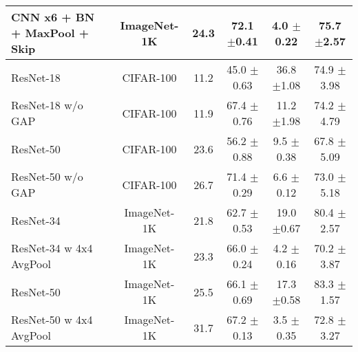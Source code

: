 \begin{table}[h]
{\begin{tabular}{@{}lccccc@{}}
CNN x6 + BN + MaxPool + Skip & ImageNet-1K & 24.3 & 72.1 $\pm$0.41 & 4.0 $\pm$0.22 & 75.7 $\pm$2.57 \\ \midrule \midrule
ResNet-18 & CIFAR-100 & 11.2 & 45.0 $\pm$0.63 & 36.8 $\pm$1.08 & 74.9 $\pm$3.98 \\
ResNet-18 w/o GAP & CIFAR-100 & 11.9 & 67.4 $\pm$0.76 & 11.2 $\pm$1.98 & 74.2 $\pm$4.79 \\
ResNet-50 & CIFAR-100 & 23.6 & 56.2 $\pm$0.88 & 9.5 $\pm$0.38 & 67.8 $\pm$5.09 \\
ResNet-50 w/o GAP& CIFAR-100 & 26.7 & 71.4 $\pm$0.29 & 6.6 $\pm$0.12 & 73.0 $\pm$5.18 \\ \midrule
ResNet-34 & ImageNet-1K & 21.8 & 62.7 $\pm$0.53 & 19.0 $\pm$0.67 & 80.4 $\pm$2.57 \\
ResNet-34 w 4x4 AvgPool & ImageNet-1K & 23.3 & 66.0 $\pm$0.24 & 4.2 $\pm$0.16 & 70.2 $\pm$3.87 \\
ResNet-50 & ImageNet-1K & 25.5 & 66.1 $\pm$0.69 & 17.3 $\pm$0.58 & 83.3 $\pm$1.57 \\
ResNet-50 w 4x4 AvgPool & ImageNet-1K & 31.7 & 67.2 $\pm$0.13 & 3.5 $\pm$0.35 & 72.8 $\pm$3.27 \\ \bottomrule
\end{tabular}%
}
\end{table}





